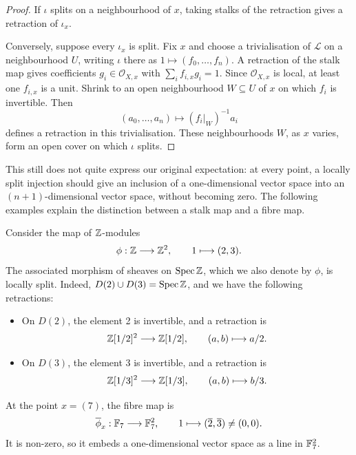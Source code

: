 \begin{proof}
    If \(\iota\) splits on a neighbourhood of \(x\), taking stalks of the
    retraction gives a retraction of \(\iota_x\).

    Conversely, suppose every \(\iota_x\) is split. Fix \(x\) and choose
    a trivialisation of \(\mathcal{L}\) on a neighbourhood \(U\), writing
    \(\iota\) there as \(1\mapsto(f_0,\dots,f_n)\). A retraction of the
    stalk map gives coefficients \(g_i\in\mathcal{O}_{X,x}\) with
    \(\sum_i f_{i,x}g_i=1\). Since \(\mathcal{O}_{X,x}\) is local, at least
    one \(f_{i,x}\) is a unit. Shrink to an open neighbourhood
    \(W\subseteq U\) of \(x\) on which \(f_i\) is invertible. Then
    \[
        (a_0,\dots,a_n)\longmapsto (f_i|_W)^{-1}a_i
    \]
    defines a retraction in this trivialisation. These neighbourhoods
    \(W\), as \(x\) varies, form an open cover on which \(\iota\) splits.
\end{proof}

This still does not quite express our original expectation: at every
point, a locally split injection should give an inclusion of a
one-dimensional vector space into an \((n+1)\)-dimensional vector space,
without becoming zero. The following examples explain the distinction
between a stalk map and a fibre map.

\begin{example}\label{ex:lsi-23}
    Consider the map of \(\mathbb{Z}\)-modules
    \[
        \phi:\mathbb{Z}\longrightarrow\mathbb{Z}^2,
        \qquad 1\longmapsto(2,3).
    \]
    The associated morphism of sheaves on \(\operatorname{Spec}\mathbb{Z}\), which we also
    denote by \(\phi\), is locally split. Indeed,
    \(D(2)\cup D(3)=\operatorname{Spec}\mathbb{Z}\), and we have the following retractions:
    \begin{itemize}
        \item On \(D(2)\), the element 2 is invertible, and a retraction is
            \[
                \mathbb{Z}[1/2]^2\longrightarrow\mathbb{Z}[1/2],
                \qquad (a,b)\longmapsto a/2.
            \]
        \item On \(D(3)\), the element 3 is invertible, and a retraction is
            \[
                \mathbb{Z}[1/3]^2\longrightarrow\mathbb{Z}[1/3],
                \qquad (a,b)\longmapsto b/3.
            \]
    \end{itemize}
    At the point \(x=(7)\), the fibre map is
    \[
        \overline{\phi}_x:\mathbb{F}_7\longrightarrow\mathbb{F}_7^2,
        \qquad 1\longmapsto(\overline{2},\overline{3})\ne(0,0).
    \]
    It is non-zero, so it embeds a one-dimensional vector space as a
    line in \(\mathbb{F}_7^2\).
\end{example}


